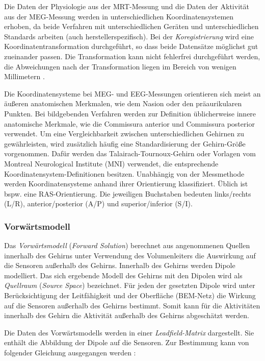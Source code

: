 \documentclass[doc,a4paper,12pt]{apa6}
\begin{document}
Die Daten der Physiologie aus der MRT-Messung und die Daten der Aktivität aus der MEG-Messung werden in unterschiedlichen Koordinatensystemen erhoben, da beide Verfahren mit unterschiedlichen Geräten und unterschiedlichen Standards arbeiten (auch herstellerspezifisch). Bei der \emph{Koregistrierung} wird eine Koordinatentransformation durchgeführt, so dass beide Datensätze möglichst gut zueinander passen. Die Transformation kann nicht fehlerfrei durchgeführt werden, die Abweichungen nach der Transformation liegen im Bereich von wenigen Millimetern \parencite{adjamian2004co,poghosyan2007precise}.

Die Koordinatensysteme bei MEG- und EEG-Messungen orientieren sich meist an äußeren anatomischen Merkmalen, wie dem Nasion oder den präaurikularen Punkten. Bei bildgebenden Verfahren werden zur Definition üblicherweise innere anatomische Merkmale, wie die Commissura anterior und Commissura posterior verwendet. Um eine Vergleichbarkeit zwischen unterschiedlichen Gehirnen zu gewährleisten, wird zusätzlich häufig eine Standardisierung der Gehirn-Größe vorgenommen. Dafür werden das Talairach-Tournoux-Gehirn oder Vorlagen vom Montreal Neurological Institute (MNI) verwendet, die entsprechende Koordinatensystem-Definitionen besitzen. Unabhängig von der Messmethode werden Koordinatensysteme anhand ihrer Orientierung klassifiziert. Üblich ist bspw. eine RAS-Orientierung. Die jeweiligen Buchstaben bedeuten links/rechts (L/R), anterior/posterior (A/P) und superior/inferior (S/I).

\subsubsection{Vorwärtsmodell}
\label{sec:lead}

Das \emph{Vorwärtsmodell} (\emph{Forward Solution}) berechnet aus angenommenen Quellen innerhalb des Gehirns unter Verwendung des Volumenleiters die Auswirkung auf die Sensoren außerhalb des Gehirns. Innerhalb des Gehirns werden Dipole modelliert. Das sich ergebende Modell des Gehirns mit den Dipolen wird als \emph{Quellraum} (\emph{Source Space}) bezeichnet. Für jeden der gesetzten Dipole wird unter Berücksichtigung der Leitfähigkeit und der Oberfläche (BEM-Netz) die Wirkung auf die Sensoren außerhalb des Gehirns bestimmt. Somit kann für die Aktivitäten innerhalb des Gehirn die Aktivität außerhalb des Gehirns abgeschätzt werden.

Die Daten des Vorwärtsmodells werden in einer \emph{Leadfield-Matrix} dargestellt. Sie enthält die Abbildung der Dipole auf die Sensoren. Zur Bestimmung kann von folgender Gleichung ausgegangen werden \parencite{maurits2011neurology}:
\end{document}
